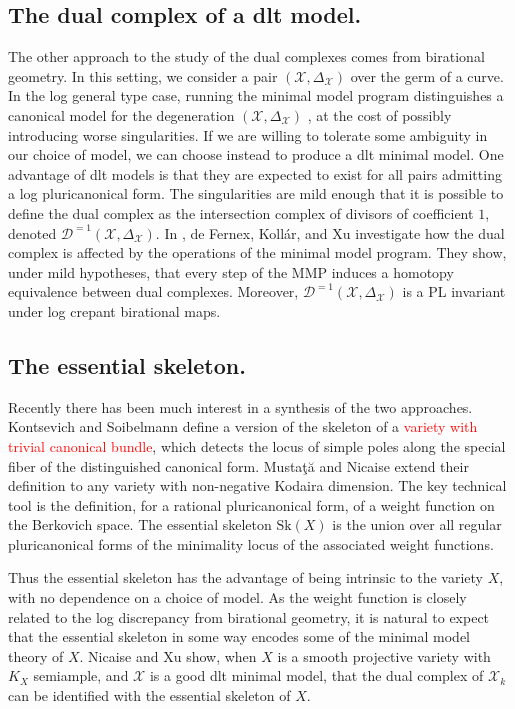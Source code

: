 \documentclass{amsart}%
\numberwithin{equation}{subsection}
\theoremstyle{plain2}
\theoremstyle{definition2}
\theoremstyle{stepstyle}
\theoremstyle{point}
\theoremstyle{subpoint}
\newcommand{\D}{{\mathcal D}}
\newcommand{\cX}{\ensuremath{\mathscr{X}}}
\newcommand{\Sk}{\mathrm{Sk}}
\begin{document}
\subsection{The dual complex of a dlt model.} The other approach to the study of the dual complexes comes from birational geometry. In this setting, we consider a pair $(\cX, \Delta_\cX)$ over the germ of a curve. In the log general type case, running the minimal model program distinguishes a canonical model for the degeneration $(\cX, \Delta_\cX)$ \cite{Alexeev, KollarShepherd-Barron, HaconMcKernanXu}, at the cost of possibly introducing worse singularities. If we are willing to tolerate some ambiguity in our choice of model, we can choose instead to produce a dlt minimal model. One advantage of dlt models is that they are expected to exist for all pairs admitting a log pluricanonical form. The singularities are mild enough that it is possible to define the dual complex as the intersection complex of divisors of coefficient $1$, denoted $\D^{=1}(\cX,\Delta_\cX)$. In \cite{deFernexKollarXu2012}, de Fernex, Koll{\'a}r, and Xu investigate how the dual complex is affected by the operations of the minimal model program. They show, under mild hypotheses, that every step of the MMP induces a homotopy equivalence between dual complexes. Moreover, $\D^{=1}(\cX,\Delta_\cX)$ is a PL invariant under log crepant birational maps.

\subsection{The essential skeleton.} Recently there has been much interest in a synthesis of the two approaches. Kontsevich and Soibelmann \cite{KontsevichSoibelman} define a version of the skeleton of a \textcolor{red}{variety with trivial canonical bundle}, which detects the locus of simple poles along the special fiber of the distinguished canonical form. Musta{\c{t}}{\u{a}} and Nicaise \cite{MustataNicaise} extend their definition to any variety with non-negative Kodaira dimension. The key technical tool is the definition, for a rational pluricanonical form, of a weight function on the Berkovich space. The essential skeleton $\Sk(X)$ is the union over all regular pluricanonical forms of the minimality locus of the associated weight functions.

Thus the essential skeleton has the advantage of being intrinsic to the variety $X$, with no dependence on a choice of model. As the weight function is closely related to the log discrepancy from birational geometry, it is natural to expect that the essential skeleton in some way encodes some of the minimal model theory of $X$. Nicaise and Xu \cite{NicaiseXu} show, when $X$ is a smooth projective variety with $K_X$ semiample, and $\cX$ is a good dlt minimal model, that the dual complex of $\cX_k$ can be identified with the essential skeleton of $X$.
\end{document}

